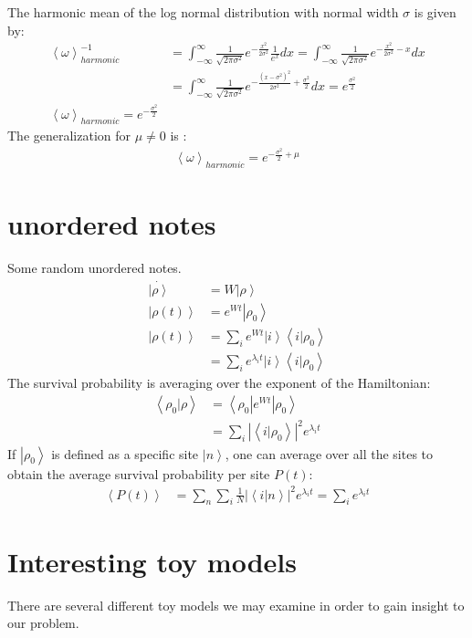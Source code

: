 \documentclass[onecolumn,fleqn]{revtex4}
\newcommand{\abs}[1]{\left|#1\right|}
\newcommand{\aket}[1]{\left| #1 \right\rangle}
\newcommand{\abra}[1]{\left\langle #1 \right|}
\newcommand{\abraket}[2]{\left\langle #1 | #2   \right\rangle}
\newcommand{\avg}[1]{\left\langle #1 \right\rangle}
\begin{document}
The harmonic mean of the log normal distribution with normal width $\sigma$ is given by:
\begin{align}
\avg{\omega}_{harmonic}^{-1} &= \int_{-\infty}^\infty \frac{1}{\sqrt{2\pi\sigma^2}}e^{-\frac{x^2}{2\sigma^2}} \frac{1}{e^x} dx  = \int_{-\infty}^\infty \frac{1}{\sqrt{2\pi\sigma^2}}e^{-\frac{x^2}{2\sigma^2}-x} dx \\
&= \int_{-\infty}^\infty \frac{1}{\sqrt{2\pi\sigma^2}}e^{-\frac{\left(x-\sigma^2\right)^2}{2\sigma^2}+\frac{\sigma^2}{2}} dx = e^{\frac{\sigma^2}{2}}\\
\avg{\omega}_{harmonic} = e^{-\frac{\sigma^2}{2}}
\end{align}
The generalization for $\mu\neq 0$ is :
\begin{align}
\avg{\omega}_{harmonic} = e^{-\frac{\sigma^2}{2}+\mu}
\end{align}



\section{unordered notes}
Some random unordered notes.
\begin{align}\label{eq:rho_of_t}
\dot{\aket{\rho}}&=W\aket{\rho} \\
\aket{\rho(t)} &= e^{Wt}\aket{\rho_0} \\
\aket{\rho(t)} &= \sum_i e^{Wt}\aket{i}\abraket{i}{\rho_0} \\
&= \sum_i e^{\lambda_i t}\aket{i}\abraket{i}{\rho_0}
\end{align}
The survival probability is averaging over the exponent of the Hamiltonian:
\begin{align}
\abraket{\rho_0}{\rho} &= \abra{\rho_0}e^{Wt}\aket{\rho_0} \\
&= \sum_i \abs{\abraket{i}{\rho_0}}^2e^{\lambda_it}
\end{align}
If $\aket{\rho_0}$ is defined as a specific site $\aket{n}$, one can average over all the sites to obtain the average survival probability per site $P(t)$: 
\begin{align}
\avg{ P(t) } &= \sum_n\sum_i \frac{1}{N}\abs{\abraket{i}{n}}^2e^{\lambda_it}= \sum_i e^{\lambda_i t}
\end{align}

\section{Interesting toy models}
There are several different toy models we may examine in order to gain insight to our problem.
\end{document}
